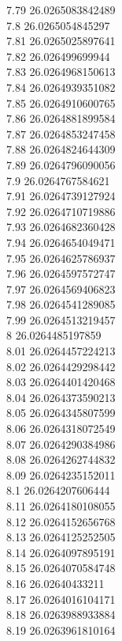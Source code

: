 {7.79	26.0265083842489\\
7.8	26.0265054845297\\
7.81	26.0265025897641\\
7.82	26.026499699944\\
7.83	26.0264968150613\\
7.84	26.0264939351082\\
7.85	26.0264910600765\\
7.86	26.0264881899584\\
7.87	26.0264853247458\\
7.88	26.0264824644309\\
7.89	26.0264796090056\\
7.9	26.0264767584621\\
7.91	26.0264739127924\\
7.92	26.0264710719886\\
7.93	26.0264682360428\\
7.94	26.0264654049471\\
7.95	26.0264625786937\\
7.96	26.0264597572747\\
7.97	26.0264569406823\\
7.98	26.0264541289085\\
7.99	26.0264513219457\\
8	26.0264485197859\\
8.01	26.0264457224213\\
8.02	26.0264429298442\\
8.03	26.0264401420468\\
8.04	26.0264373590213\\
8.05	26.0264345807599\\
8.06	26.0264318072549\\
8.07	26.0264290384986\\
8.08	26.0264262744832\\
8.09	26.0264235152011\\
8.1	26.0264207606444\\
8.11	26.0264180108055\\
8.12	26.0264152656768\\
8.13	26.0264125252505\\
8.14	26.0264097895191\\
8.15	26.0264070584748\\
8.16	26.02640433211\\
8.17	26.0264016104171\\
8.18	26.0263988933884\\
8.19	26.0263961810164\\
}
